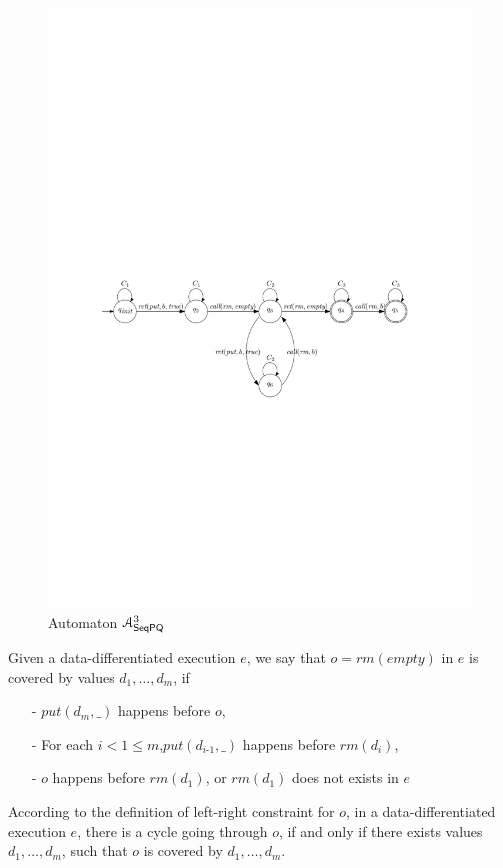 \begin{figure}[htbp]
  \centering
  \includegraphics[width=0.8 \textwidth]{figures/PIC_AUTO_PQ3.pdf}
  \caption{Automaton $\mathcal{A}_{\mathsf{SeqPQ}}^3$}
  \label{fig:automata for PQ3}
\end{figure}

Given a data-differentiated execution $e$, we say that $o = \textit{rm}(\textit{empty})$ in $e$ is covered by values $d_1,\ldots,d_m$, if

\begin{itemize}
\setlength{\itemsep}{0.5pt}
\item[-] $\textit{put}(d_m,\_)$ happens before $o$,

\item[-] For each $i < 1 \leq m$,$\textit{put}(d_{\textit{i-1}},\_)$ happens before $\textit{rm}(d_i)$,

\item[-] $o$ happens before $\textit{rm}(d_1)$, or $\textit{rm}(d_1)$ does not exists in $e$
\end{itemize}

According to the definition of left-right constraint for $o$, in a data-differentiated execution $e$, there is a cycle going through $o$, if and only if there exists values $d_1,\ldots,d_m$, such that $o$ is covered by $d_1,\ldots,d_m$.


